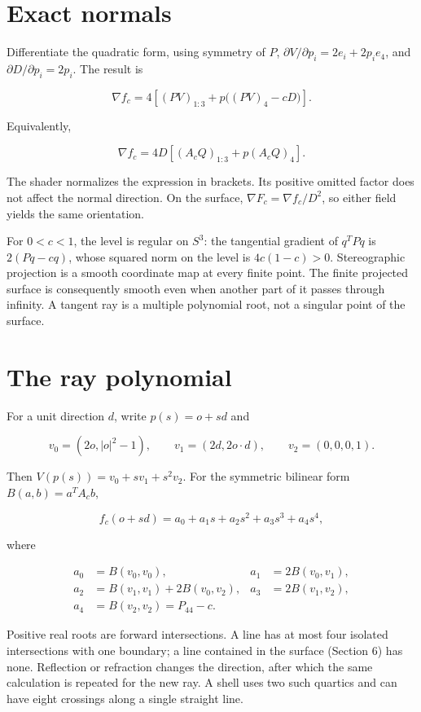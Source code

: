 \documentclass[11pt,a4paper]{article}
\begin{document}
\section{Exact normals}\label{exact-normals}

Differentiate the quadratic form, using symmetry of \(P\),
\(\partial V/\partial p_i=2e_i+2p_i e_4\), and
\(\partial D/\partial p_i=2p_i\). The result is

\[
\boxed{\nabla f_c=4\left[(PV)_{1:3}+p\bigl((PV)_4-cD\bigr)\right].}
\]

Equivalently,

\[
\nabla f_c=4D\left[(A_cQ)_{1:3}+p(A_cQ)_4\right].
\]

The shader normalizes the expression in brackets. Its positive omitted
factor does not affect the normal direction. On the surface,
\(\nabla F_c=\nabla f_c/D^2\), so either field yields the same
orientation.

For \(0<c<1\), the level is regular on \(S^3\): the tangential gradient
of \(q^TPq\) is \(2(Pq-cq)\), whose squared norm on the level is
\(4c(1-c)>0\). Stereographic projection is a smooth coordinate map at
every finite point. The finite projected surface is consequently smooth
even when another part of it passes through infinity. A tangent ray is a
multiple polynomial root, not a singular point of the surface.

\section{The ray polynomial}\label{the-ray-polynomial}

For a unit direction \(d\), write \(p(s)=o+s d\) and

\[
v_0=(2o,|o|^2-1),\qquad v_1=(2d,2o\cdot d),\qquad v_2=(0,0,0,1).
\]

Then \(V(p(s))=v_0+s v_1+s^2v_2\). For the symmetric bilinear form
\(B(a,b)=a^TA_cb\),

\[
f_c(o+s d)=a_0+a_1s+a_2s^2+a_3s^3+a_4s^4,
\]

where

\[
\begin{aligned}
a_0&=B(v_0,v_0), & a_1&=2B(v_0,v_1),\\
a_2&=B(v_1,v_1)+2B(v_0,v_2), & a_3&=2B(v_1,v_2),\\
a_4&=B(v_2,v_2)=P_{44}-c.
\end{aligned}
\]

Positive real roots are forward intersections. A line has at most four
isolated intersections with one boundary; a line contained in the
surface (Section 6) has none. Reflection or refraction changes the
direction, after which the same calculation is repeated for the new ray.
A shell uses two such quartics and can have eight crossings along a
single straight line.
\end{document}
